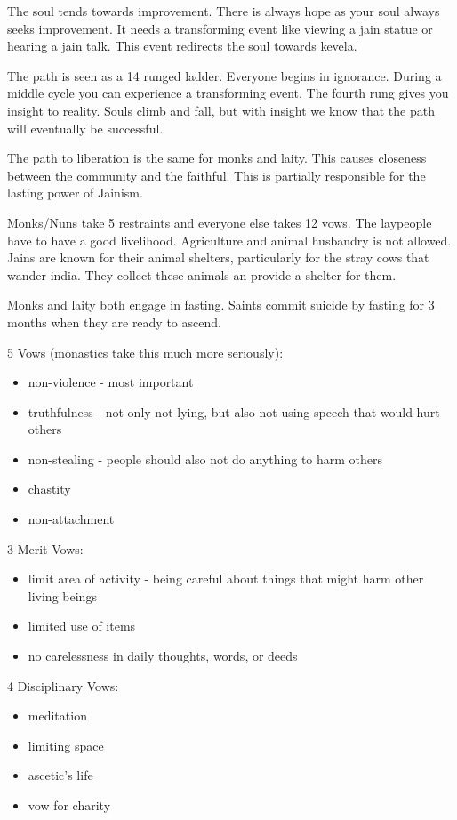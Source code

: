 \documentclass{article}
\begin{document}
The soul tends towards improvement. There is always hope as your soul always seeks improvement. It needs a transforming event like viewing a jain statue or hearing a jain talk. This event redirects the soul towards kevela.

The path is seen as a 14 runged ladder. Everyone begins in ignorance. During a middle cycle you can experience a transforming event. The fourth rung gives you insight to reality. Souls climb and fall, but  with insight we know that the path will eventually be successful.

The path to liberation is the same for monks and laity. This causes closeness between the community and the faithful. This is partially responsible for the lasting power of Jainism.

Monks/Nuns take 5 restraints and everyone else takes 12 vows. The laypeople have to have a good livelihood. Agriculture and animal husbandry is not allowed. Jains are known for their animal shelters, particularly for the stray cows that wander india. They collect these animals an provide a shelter for them.

Monks and laity both engage in fasting. Saints commit suicide by fasting for 3 months when they are ready to ascend.

5 Vows (monastics take this much more seriously):
\begin{itemize}
	\item non-violence - most important
	\item truthfulness - not only not lying, but also not using speech that would hurt others
	\item non-stealing - people should also not do anything to harm others
	\item chastity
	\item non-attachment
\end{itemize}
3 Merit Vows:
\begin{itemize}
	\item limit area of activity - being careful about things that might harm other living beings
	\item limited use of items
	\item no carelessness in daily thoughts, words, or deeds
\end{itemize}
4 Disciplinary Vows:
\begin{itemize}
	\item meditation
	\item limiting space
	\item ascetic's life
	\item vow for charity
\end{itemize}
\end{document}

